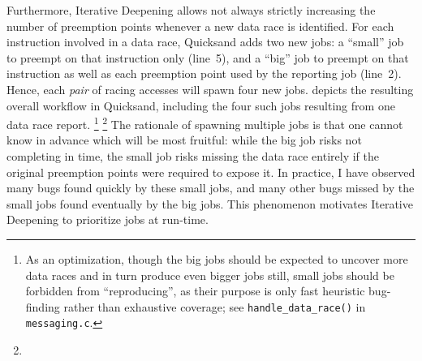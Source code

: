 Furthermore,
Iterative Deepening allows not always strictly increasing the number of preemption points
whenever a new data race is identified.
For each instruction involved in a data race, Quicksand adds two new jobs:
a ``small'' job to preempt on that instruction only (line~5),
and a ``big'' job to preempt on that instruction as well as each preemption point used by the reporting job (line~2).
%
Hence,
each {\em pair} of racing accesses will spawn four new jobs.
 depicts the resulting overall workflow in Quicksand,
including the four such jobs resulting from one data race report.%
\footnote{As an optimization,
though the big jobs should be expected to uncover more data races and in turn
produce even bigger jobs still,
small jobs should be forbidden from ``reproducing'',
as their purpose is only fast heuristic bug-finding rather than exhaustive coverage;
see {\tt handle\_data\_race()} in {\tt messaging.c}.}%
\footnote{}
%
The rationale of spawning multiple jobs is that one cannot know in advance which will be most fruitful:
while the big job risks not completing in time,
the small job risks missing the data race entirely if the original preemption points were required to expose it.
In practice, I have observed many bugs found quickly by these small jobs,
and many other bugs missed by the small jobs found eventually by the big jobs.
This phenomenon motivates Iterative Deepening to prioritize jobs at run-time.

